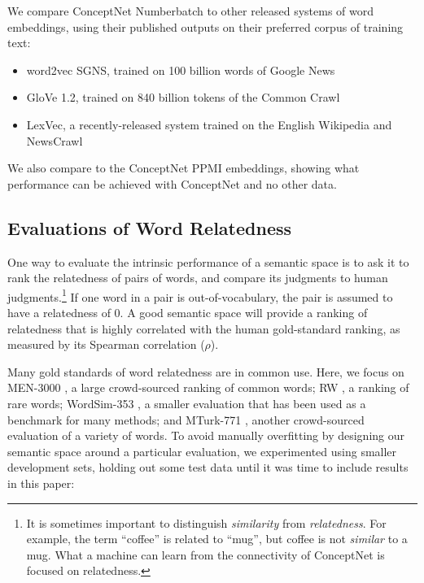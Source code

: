 \documentclass[letterpaper]{article}
\begin{document}
We compare ConceptNet Numberbatch to other released systems of word embeddings,
using their published outputs on their preferred corpus of training text:

\begin{itemize}
    \item word2vec SGNS, trained on 100 billion words of Google News \cite{mikolov2013word2vec}
    \item GloVe 1.2, trained on 840 billion tokens of the Common Crawl \cite{pennington2014glove}
    \item LexVec, a recently-released system trained on the English Wikipedia and NewsCrawl \cite{salle2016lexvec}
\end{itemize}

We also compare to the ConceptNet PPMI embeddings, showing what performance
can be achieved with ConceptNet and no other data.

\subsection{Evaluations of Word Relatedness}
\label{intrinsic-evaluations}

One way to evaluate the intrinsic performance of a semantic space is to ask it
to rank the relatedness of pairs of words, and compare its judgments to human
judgments.\footnote{It is sometimes important to distinguish \emph{similarity}
from \emph{relatedness}. For example, the term ``coffee'' is related to
``mug'', but coffee is not \emph{similar} to a mug. What a machine can learn
from the connectivity of ConceptNet is focused on relatedness.} If one word in
a pair is out-of-vocabulary, the pair is assumed to have a relatedness of 0. A
good semantic space will provide a ranking of relatedness that is highly
correlated with the human gold-standard ranking, as measured by its Spearman
correlation ($\rho$).

Many gold standards of word relatedness are in common use. Here, we focus on
MEN-3000 \cite{bruni2014men}, a large crowd-sourced ranking of common words; RW
\cite{luong2013rw}, a ranking of rare words; WordSim-353 \cite{finkelstein2001ws},
a smaller evaluation that has been used as a benchmark for many methods; and MTurk-771
\cite{halawi2012mturk}, another crowd-sourced evaluation of a variety of words.
To avoid manually overfitting by designing our semantic space around a
particular evaluation, we experimented using smaller development sets, holding
out some test data until it was time to include results in this paper:
\end{document}
